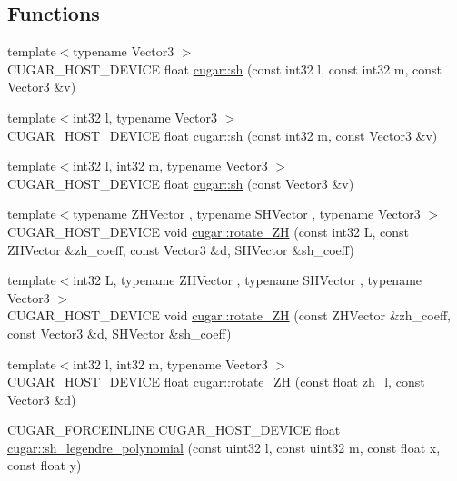 \subsection*{Functions}
\begin{DoxyCompactItemize}
\item 
{\footnotesize template$<$typename Vector3 $>$ }\\C\+U\+G\+A\+R\+\_\+\+H\+O\+S\+T\+\_\+\+D\+E\+V\+I\+CE float \hyperlink{group__spherical__harmonics_ga4a19db33e0259a49e5d872f18d7996c2}{cugar\+::sh} (const int32 l, const int32 m, const Vector3 \&v)
\item 
{\footnotesize template$<$int32 l, typename Vector3 $>$ }\\C\+U\+G\+A\+R\+\_\+\+H\+O\+S\+T\+\_\+\+D\+E\+V\+I\+CE float \hyperlink{group__spherical__harmonics_gacbaf1fe0a158310ce09117940766f617}{cugar\+::sh} (const int32 m, const Vector3 \&v)
\item 
{\footnotesize template$<$int32 l, int32 m, typename Vector3 $>$ }\\C\+U\+G\+A\+R\+\_\+\+H\+O\+S\+T\+\_\+\+D\+E\+V\+I\+CE float \hyperlink{group__spherical__harmonics_ga41a8f3c96516611a04d677c1af75c542}{cugar\+::sh} (const Vector3 \&v)
\item 
{\footnotesize template$<$typename Z\+H\+Vector , typename S\+H\+Vector , typename Vector3 $>$ }\\C\+U\+G\+A\+R\+\_\+\+H\+O\+S\+T\+\_\+\+D\+E\+V\+I\+CE void \hyperlink{group__spherical__harmonics_ga5d1edfb2dfc7c53051c512e0d7c6d21d}{cugar\+::rotate\+\_\+\+ZH} (const int32 L, const Z\+H\+Vector \&zh\+\_\+coeff, const Vector3 \&d, S\+H\+Vector \&sh\+\_\+coeff)
\item 
{\footnotesize template$<$int32 L, typename Z\+H\+Vector , typename S\+H\+Vector , typename Vector3 $>$ }\\C\+U\+G\+A\+R\+\_\+\+H\+O\+S\+T\+\_\+\+D\+E\+V\+I\+CE void \hyperlink{group__spherical__harmonics_ga26fd25de1095f8c798028bce5bcf3922}{cugar\+::rotate\+\_\+\+ZH} (const Z\+H\+Vector \&zh\+\_\+coeff, const Vector3 \&d, S\+H\+Vector \&sh\+\_\+coeff)
\item 
{\footnotesize template$<$int32 l, int32 m, typename Vector3 $>$ }\\C\+U\+G\+A\+R\+\_\+\+H\+O\+S\+T\+\_\+\+D\+E\+V\+I\+CE float \hyperlink{group__spherical__harmonics_gafb4e2ee177fc0d4bf43999edd3aed697}{cugar\+::rotate\+\_\+\+ZH} (const float zh\+\_\+l, const Vector3 \&d)
\item 
C\+U\+G\+A\+R\+\_\+\+F\+O\+R\+C\+E\+I\+N\+L\+I\+NE C\+U\+G\+A\+R\+\_\+\+H\+O\+S\+T\+\_\+\+D\+E\+V\+I\+CE float \hyperlink{group__spherical__harmonics_ga42386bd8275ff973952f8d88e6c58cbf}{cugar\+::sh\+\_\+legendre\+\_\+polynomial} (const uint32 l, const uint32 m, const float x, const float y)

\end{DoxyCompactItemize}
